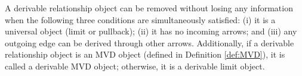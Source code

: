 A derivable relationship object can be removed without losing any information when the following three conditions are simultaneously satisfied: (i) it is a universal object (limit or pullback); (ii) it has no incoming arrows; and (iii) any outgoing edge can be derived through other arrows. Additionally, if a derivable relationship object is an MVD object (defined in Definition \ref{def:MVD}), it is called a derivable MVD object; otherwise, it is a derivable limit object.









